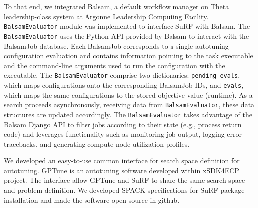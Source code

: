 To that end, we integrated Balsam, a default workflow manager on Theta leadership-class system at Argonne Leadership Computing Facility. \texttt{BalsamEvaluator} module was implemented to interface SuRF with Balsam. The \texttt{BalsamEvaluator} uses the Python API provided by Balsam to interact with the BalsamJob database. Each BalsamJob corresponds to a single autotuning configuration evaluation and contains information pointing to the task executable and the command-line arguments used to run the configuration with the executable. The \texttt{BalsamEvaluator} comprise two dictionaries: \texttt{pending\_evals}, which maps configurations onto the corresponding BalsamJob IDs, and \texttt{evals}, which maps the same configurations to the stored objective value (runtime). As a search proceeds asynchronously, receiving data from \texttt{BalsamEvaluator}, these data structures are updated accordingly. The \texttt{BalsamEvaluator} takes advantage of the Balsam Django API to filter jobs according to their state (e.g., process return code) and leverages functionality such as monitoring job output, logging error tracebacks, and generating compute node utilization profiles.

We developed an easy-to-use common interface for search space definition for autotuning. GPTune is an autotuning software developed within xSDK4ECP project. The interface allow GPTune and SuRF to share the same search space and problem definition. We developed SPACK specifications for SuRF package installation and made the software open source in github.



